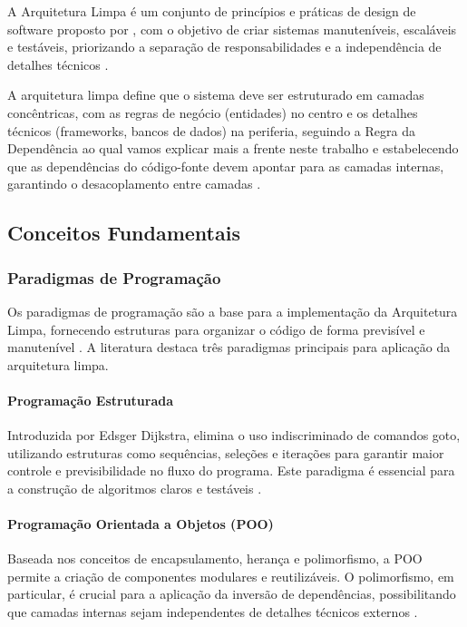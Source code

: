         \par A Arquitetura Limpa é um conjunto de princípios e práticas de design de software proposto por \cite{livro:martin:cleanarch}, com o objetivo de criar sistemas manuteníveis, escaláveis e testáveis, priorizando a separação de responsabilidades e a independência de detalhes técnicos \cite{livro:martin:cleanarch}.

        \par A arquitetura limpa define que o sistema deve ser estruturado em camadas concêntricas, com as regras de negócio (entidades) no centro e os detalhes técnicos (frameworks, bancos de dados) na periferia, seguindo a Regra da Dependência ao qual vamos explicar mais a frente neste trabalho e estabelecendo que as dependências do código-fonte devem apontar para as camadas internas, garantindo o desacoplamento entre camadas \cite{livro:martin:cleanarch}.

    \subsection{Conceitos Fundamentais}
    
        \subsubsection{Paradigmas de Programação}

            \par Os paradigmas de programação são a base para a implementação da Arquitetura Limpa, fornecendo estruturas para organizar o código de forma previsível e manutenível \cite{livro:martin:cleanarch}. A literatura destaca três paradigmas principais para aplicação da arquitetura limpa.

            \paragraph{Programação Estruturada}
                \par Introduzida por Edsger Dijkstra, elimina o uso indiscriminado de comandos goto, utilizando estruturas como sequências, seleções e iterações para garantir maior controle e previsibilidade no fluxo do programa. Este paradigma é essencial para a construção de algoritmos claros e testáveis \cite{livro:martin:cleanarch}.

            \paragraph{Programação Orientada a Objetos (POO)}
                \par Baseada nos conceitos de encapsulamento, herança e polimorfismo, a POO permite a criação de componentes modulares e reutilizáveis. O polimorfismo, em particular, é crucial para a aplicação da inversão de dependências, possibilitando que camadas internas sejam independentes de detalhes técnicos externos \cite{livro:martin:cleanarch}.

